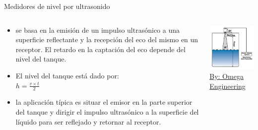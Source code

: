 \documentclass[aspectratio=169]{beamer}
\begin{document}
\begin{frame}{Medidores de nivel por ultrasonido}
    \begin{columns}[c, onlytextwidth]
        \begin{column}{0.5\textwidth}
                
            \begin{itemize}
                \item se basa en la emisión de un impulso ultrasónico a una superficie reflectante y la recepción del eco del mismo en un receptor. El retardo en la captación del eco depende del nivel del tanque.
                \item El nivel del tanque está dado por:\\
                $h=\frac{v \times t}{2}$
                \item la aplicación típica es situar el emisor en la parte superior del tanque y dirigir el impulso ultrasónico a la superficie del líquido para ser reflejado y retornar al receptor.
            \end{itemize}
                
        \end{column}
        \begin{column}{0.50\textwidth}
        \centering
            \includegraphics[width = 0.8\linewidth]{fig/Nivel/ultrasonic.jpg}\\
            \tiny{\href{https://es.omega.com/technical-learning/transmisores-flujo-nivel-monitoreo-presion-recipiente.html}{By: Omega Engineering}}
        \end{column}
    \end{columns}
\end{frame}
\end{document}
